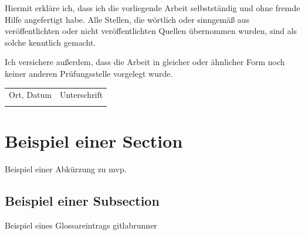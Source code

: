 \documentclass[10pt, ngerman, a4paper,toc=graduated, parskip=half, numbers=noenddot, headings=standardclasses, nonumberlist]{scrartcl}
\begin{document}
\newpage
\hypersetup{pageanchor=true}
\renewcommand{\thepage}{\Roman{page}}
\tableofcontents{}


\newpage
\cleardoublepage
{}

Hiermit erkläre ich, dass ich die vorliegende Arbeit selbstständig und ohne fremde Hilfe angefertigt habe. 
Alle Stellen, die wörtlich oder sinngemäß aus veröffentlichten oder nicht veröffentlichten Quellen übernommen wurden, 
sind als solche kenntlich gemacht.

Ich versichere außerdem, dass die Arbeit in gleicher oder ähnlicher Form noch keiner anderen Prüfungsstelle vorgelegt wurde.

\vspace{2cm}

\noindent
\begin{tabular}{@{}p{6cm}p{6cm}@{}}
Ort, Datum & Unterschrift \\[1.5cm]
\hrulefill & \hrulefill
\end{tabular}

\newpage
\cleardoublepage{}
{}
\listoffigures
\renewcommand{\figurename}{Abb.}

\newpage
\cleardoublepage{}
\printnoidxglossary[type=\acronymtype, title= Abkürzungsverzeichnis]

\newpage
\cleardoublepage{}
\printnoidxglossary[title= Glossar]

\newpage
\cleardoublepage{}
{}
\listoftables

\newpage
{}
\renewcommand{\thepage}{\arabic{page}}

\section{Beispiel einer Section}
\label{beispiel_einer_section}
Beispiel einer Abkürzung zu \gls{mvp}.

\subsection{Beispiel einer Subsection}
\label{beispiel_einer_subsection}
Beispiel eines Glossareintrags \gls{gitlabrunner}
\end{document}
